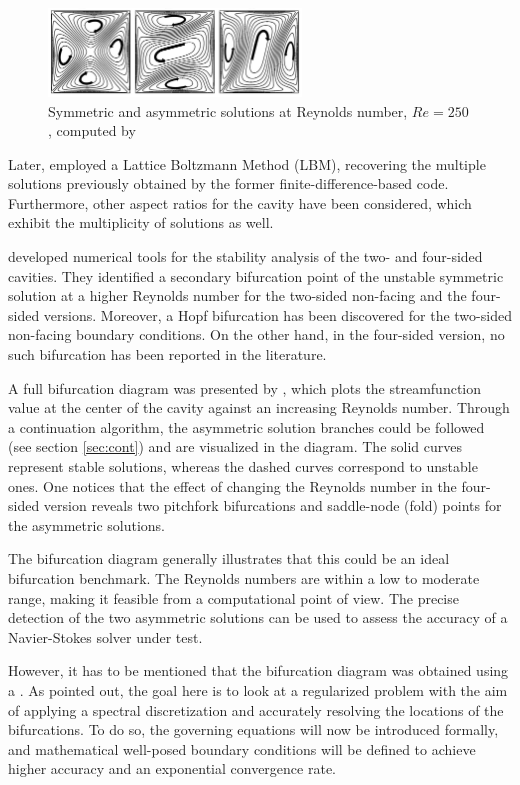 \begin{figure}[ht]
  \centering
  \includegraphics[width=0.6\textwidth]{figs/fig1_chen2013}
  \caption{Symmetric and asymmetric solutions at Reynolds number, $Re=250$,
    computed by \cite{chen2013}}
  \label{fig:4fsc_states}
\end{figure}

Later, \cite{perumal2011} employed a Lattice Boltzmann Method (LBM), recovering
the multiple solutions previously obtained by the former
finite-difference-based code. Furthermore, other aspect ratios for the cavity
have been considered, which exhibit the multiplicity of solutions as well. 

\cite{cadou2012} developed numerical tools for the stability analysis of the
two- and four-sided cavities. They identified a secondary bifurcation point of
the unstable symmetric solution at a higher Reynolds number for the two-sided
non-facing and the four-sided versions. Moreover, a Hopf bifurcation has been
discovered for the two-sided non-facing boundary conditions. On the other hand,
in the four-sided version, no such bifurcation has been reported in the
literature.

A full bifurcation diagram was presented by \cite{chen2013}, which plots the
streamfunction value at the center of the cavity against an increasing Reynolds
number. Through a continuation algorithm, the asymmetric solution branches
could be followed (see section \ref{sec:cont}) and are visualized in the
diagram. The solid curves represent stable solutions, whereas the dashed curves
correspond to unstable ones. One notices that the effect of changing the
Reynolds number in the four-sided version reveals two pitchfork bifurcations
and saddle-node (fold) points for the asymmetric solutions.

The bifurcation diagram generally illustrates that this could be an ideal
bifurcation benchmark. The Reynolds numbers are within a low to moderate
range, making it feasible from a computational point of view. The precise
detection of the two asymmetric solutions can be used to assess the accuracy of
a Navier-Stokes solver under test.

However, it has to be mentioned that the bifurcation diagram was obtained using
a . As pointed out,
the goal here is to look at a regularized problem with the aim of applying a
spectral discretization and accurately resolving the locations of the
bifurcations. To do so, the governing equations will now be introduced
formally, and mathematical well-posed boundary conditions will be defined to
achieve higher accuracy and an exponential convergence rate.

